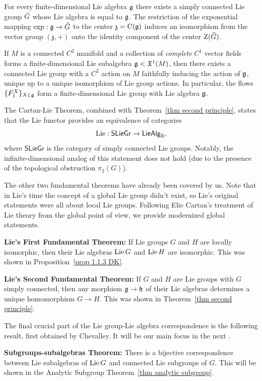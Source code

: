 \begin{thm}\label{thm 1.14.3 DK global Lie's third}
    For every finite-dimensional Lie algebra $\mathfrak{g}$ there exists a simply connected Lie group $\wt{G}$ whose Lie algebra is equal to $\mathfrak{g}$. The restriction of the exponential mapping $\exp:\frakg\to\wt{G}$ to the center $\mathfrak{z}=\mathrm{C}(\mathfrak{g})$ induces an isomorphism from the vector group $(\mathfrak{z},+)$ onto the identity component of the center $\rmZ(\wt{G})$.
\end{thm}
\begin{cor}\label{thm Lie-Palais}
    If $M$ is a connected $C^2$ manifold and a collection of \emph{complete} $C^1$ vector fields forms a finite-dimensional Lie subalgebra $\mathfrak{g}<\mathfrak{X}^1(M)$, then there exists a connected Lie group with a $C^2$ action on $M$ faithfully inducing the action of $\mathfrak{g}$, unique up to a unique isomorphism of Lie group actions. In particular, the flows $\{F^X_1\}_{X\in \mathfrak{g}}$ form a finite-dimensional Lie group with Lie algebra $\mathfrak{g}$.
\end{cor}

\begin{rem}
    The Cartan-Lie Theorem, combined with Theorem~\ref{thm second principle}, states that the Lie functor provides an equivalence of categories
    \[\operatorname{Lie}:\mathsf{SLieGr}\to \mathsf{LieAlg}_{\mathbb{R}},\]
    where $\mathsf{SLieGr}$ is the category of simply connected Lie groups. Notably, the infinite-dimensional analog of this statement does not hold (due to the presence of the topological obstruction $\pi_2(G)$).

    The other two fundamental theorems have already been covered by us. Note that in Lie's time the concept of a global Lie group didn't exist, so Lie's original statements were all about local Lie groups. Following Elie Cartan's treatment of Lie theory from the global point of view, we provide modernized global statements.

    \textbf{Lie's First Fundamental Theorem:} If Lie groups $G$ and $H$ are locally isomorphic, then their Lie algebras $\operatorname{Lie} G$ and $\operatorname{Lie} H$ are isomorphic. This was shown in Proposition~\ref{prop 1.1.3 DK}.

    \textbf{Lie's Second Fundamental Theorem:} If $G$ and $H$ are Lie groups with $G$ simply connected, then any morphism $\mathfrak{g}\to\mathfrak{h}$ of their Lie algebras determines a unique homomorphism $G\to H$. This was shown in Theorem~\ref{thm second principle}.
    
    The final crucial part of the Lie group-Lie algebra correspondence is the following result, first obtained by Chevalley. It will be our main focus in the next \subsect.

    \textbf{Subgroups-subalgebras Theorem:} There is a bijective correspondence between Lie subalgebras of $\operatorname{Lie} G$ and connected Lie subgroups of $G$. This will be shown in the Analytic Subgroup Theorem~\ref{thm analytic subgroup}.
\end{rem}


